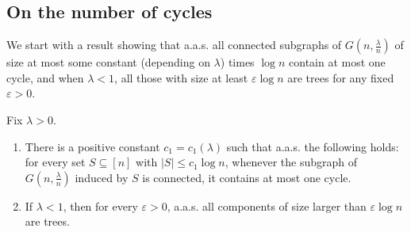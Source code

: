 \documentclass[AHL,Unicode,longabstracts,published]{cedram}
\begin{document}
\subsection{On the number of cycles}

We start with a result showing that a.a.s. all connected subgraphs of $G(n, \tfrac{\lambda}{n})$ of size at most some constant (depending on $\lambda$) times $\log n$ contain at most one cycle, and when $\lambda<1$, all those with size at least $\varepsilon \log n$ are trees for any fixed $\varepsilon>0$.


\begin{lemm}\label{lem:2 cycles}
Fix $\lambda > 0$.
\begin{enumerate}
\item There is a positive constant $c_1=c_1(\lambda)$ such that a.a.s. the following holds: for every set $ S\subseteq [n]$ with $|S| \le c_1 \log n$, whenever the subgraph of $G(n,\tfrac{\lambda}{n})$ induced by $S$ is connected, it contains at most one cycle.
\item If $\lambda < 1$, then for every $\varepsilon>0$, a.a.s. all components of size larger than $\varepsilon \log n$ are trees.
\end{enumerate}
\end{lemm}
\end{document}
